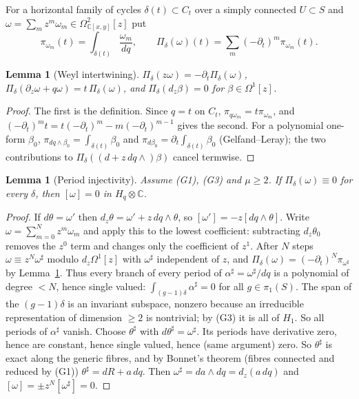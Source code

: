 \documentclass[11pt]{article}
\numberwithin{equation}{section}
\newtheorem{lemma}[theorem]{Lemma}
\theoremstyle{definition}
\theoremstyle{remark}
\newcommand{\C}{\mathbb C}\newcommand{\Q}{\mathbb Q}\newcommand{\R}{\mathbb R}\newcommand{\Z}{\mathbb Z}
\newcommand{\Hq}{H_q}
\begin{document}
For a horizontal family of cycles $\delta(t)\subset C_t$ over a simply connected
$U\subset S$ and $\omega=\sum_m z^m\omega_m\in\Omega^2_{\C[x,y]}[z]$ put
\[
 \pi_{\omega_m}(t)=\int_{\delta(t)}\frac{\omega_m}{dq},\qquad
 \Pi_\delta(\omega)(t)=\sum_m(-\partial_t)^m\pi_{\omega_m}(t).
\]
\begin{lemma}[Weyl intertwining]\label{lem:Pi}
$\Pi_\delta(z\omega)=-\partial_t\Pi_\delta(\omega)$,
$\Pi_\delta(\partial_z\omega+q\omega)=t\,\Pi_\delta(\omega)$, and
$\Pi_\delta(d_z\beta)=0$ for $\beta\in\Omega^1[z]$.
\end{lemma}
\begin{proof}
The first is the definition. Since $q=t$ on $C_t$, $\pi_{q\omega_m}=t\pi_{\omega_m}$,
and $(-\partial_t)^mt=t(-\partial_t)^m-m(-\partial_t)^{m-1}$ gives the second.
For a polynomial one-form $\beta_0$, $\pi_{dq\wedge\beta_0}=\int_{\delta(t)}\beta_0$
and $\pi_{d\beta_0}=\partial_t\int_{\delta(t)}\beta_0$ (Gelfand--Leray); the two
contributions to $\Pi_\delta((d+z\,dq\wedge)\beta)$ cancel termwise.
\end{proof}

\begin{lemma}[Period injectivity]\label{lem:injective}
Assume \textup{(G1)}, \textup{(G3)} and $\mu\ge2$. If $\Pi_\delta(\omega)\equiv0$
for every $\delta$, then $[\omega]=0$ in $\Hq\otimes\C$.
\end{lemma}
\begin{proof}
If $d\theta=\omega'$ then $d_z\theta=\omega'+z\,dq\wedge\theta$, so
$[\omega']=-z[dq\wedge\theta]$. Write $\omega=\sum_{m=0}^Nz^m\omega_m$ and apply this to the lowest coefficient:
subtracting $d_z\theta_0$ removes the $z^0$ term and changes only the
coefficient of $z^1$. After $N$ steps $\omega\equiv z^N\omega^\sharp$ modulo
$d_z\Omega^1[z]$ with $\omega^\sharp$ independent of $z$, and
$\Pi_\delta(\omega)=(-\partial_t)^N\pi_{\omega^\sharp}$ by Lemma~\ref{lem:Pi}. Thus
every branch of every period of $\alpha^\sharp=\omega^\sharp/dq$ is a polynomial of
degree $<N$, hence single valued: $\int_{(g-1)\delta}\alpha^\sharp=0$ for all
$g\in\pi_1(S)$. The span of the $(g-1)\delta$ is an invariant subspace, nonzero
because an irreducible representation of dimension $\ge2$ is nontrivial; by
(G3) it is all of $H_1$. So all periods of $\alpha^\sharp$ vanish. Choose
$\theta^\sharp$ with $d\theta^\sharp=\omega^\sharp$. Its periods have derivative
zero, hence are constant, hence single valued, hence (same argument) zero. So
$\theta^\sharp$ is exact along the generic fibres, and by Bonnet's theorem
(fibres connected and reduced by (G1)) $\theta^\sharp=dR+a\,dq$. Then
$\omega^\sharp=da\wedge dq=d_z(a\,dq)$ and $[\omega]=\pm z^N[\omega^\sharp]=0$.
\end{proof}
\end{document}
